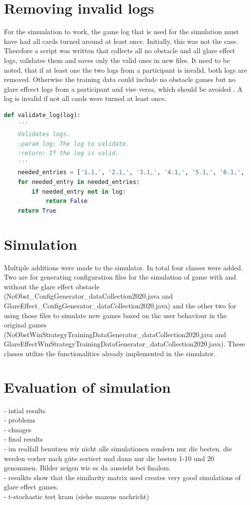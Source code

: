 \section{Removing invalid logs}
For the simualation to work, the game log that is used for the simulation must have had all cards turned around at least once. Initially, this was not the case. Therefore a script was written that collects all no obstacle and all glare effect logs, validates them and saves only the valid ones in new files. It need to be noted, that if at least one the two logs from a participant is invalid, both logs are removed. Otherwise the training data could include no obstacle games but no glare effcect logs from a participant and vise versa, which should be avoided . A log is invalid if not all cards were turned at least once. 
\begin{lstlisting}[language=python, caption=Add caption]
def validate_log(log):
	'''
	Validates logs.
	:param log: The log to validate. 
	:return: If the log is valid.
	'''
	needed_entries = ['1.1,', '2.1,', '3.1,', '4.1,', '5.1,', '6.1,', '7.1,', '1.2,', '2.2,', '3.2,', '4.2,', '5.2,', '6.2,', '7.2,']
	for needed_entry in needed_entries:
		if needed_entry not in log:
			return False
	return True
\end{lstlisting}

\section{Simulation}
Multiple additions were made to the simulator. In total four classes were added. Two are for generating configuration files for the simulation of game with and without the glare effect obstacle (NoObst\_ConfigGenerator\_dataCollection2020.java and GlareEffect\_ConfigGenerator\_dataCollection2020.java) and the other two for using those files to simulate new games based on the user behaviour in the original games (NoObstWinStrategyTrainingDataGenerator\_dataCollection2020.java and GlareEffectWinStrategyTrainingDataGenerator\_dataCollection2020.java). These classes utilize the functionalities already implemented in the simulator. 

\section{Evaluation of simulation}
- intial results\\
- problems\\
- chnages\\
- final results \\
- im realfall benutzen wir nicht alle simulationen sondern nur die besten. die werden vorher nach güte sortiert und dann nur die besten 1-10 und 20 genommen. Bilder zeigen wie es da aussieht bei finalem. \\
- resulkts show that the similarity matrix used creates very good simulations of glare effect games. \\
- t-stochastic test kram (siehe mazens nachricht)



 